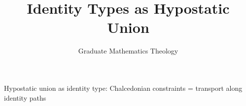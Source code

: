 \documentclass{article}
\begin{document}
\title{Identity Types as Hypostatic Union}
\author{Graduate Mathematics Theology}
\maketitle

\begin{theorem}

Hypostatic union as identity type:
Chalcedonian constraints = transport along identity paths
            
\end{theorem}
\end{document}
